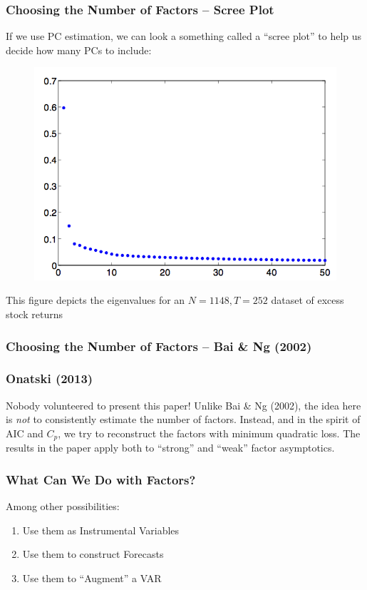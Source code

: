 \documentclass[handout]{beamer}
\begin{document}
\begin{frame}[c]\frametitle{Choosing the Number of Factors -- Scree Plot}
    
If we use PC estimation, we can look a something called a ``scree plot'' to help us decide how many PCs to include:
\begin{figure}
	\centering
	\includegraphics[scale =0.3]{scree}
\end{figure}
This figure depicts the eigenvalues for an $N=1148, T = 252$ dataset of excess stock returns
\end{frame}
\begin{frame}
	\frametitle{Choosing the Number of Factors -- Bai \& Ng (2002)}

\end{frame}
\begin{frame}
	\frametitle{Onatski (2013)}
	Nobody volunteered to present this paper! Unlike Bai \& Ng (2002), the idea here is \emph{not} to consistently estimate the number of factors. Instead, and in the spirit of AIC and $C_p$, we try to reconstruct the factors with minimum quadratic loss. The results in the paper apply both to ``strong'' and ``weak'' factor asymptotics.
\end{frame}

\begin{frame}
\frametitle{What Can We Do with Factors?}

Among other possibilities:
\begin{enumerate}
	\item Use them as Instrumental Variables 
	\item Use them to construct Forecasts
	\item Use them to ``Augment'' a VAR
\end{enumerate}

\end{frame}
\end{document}
